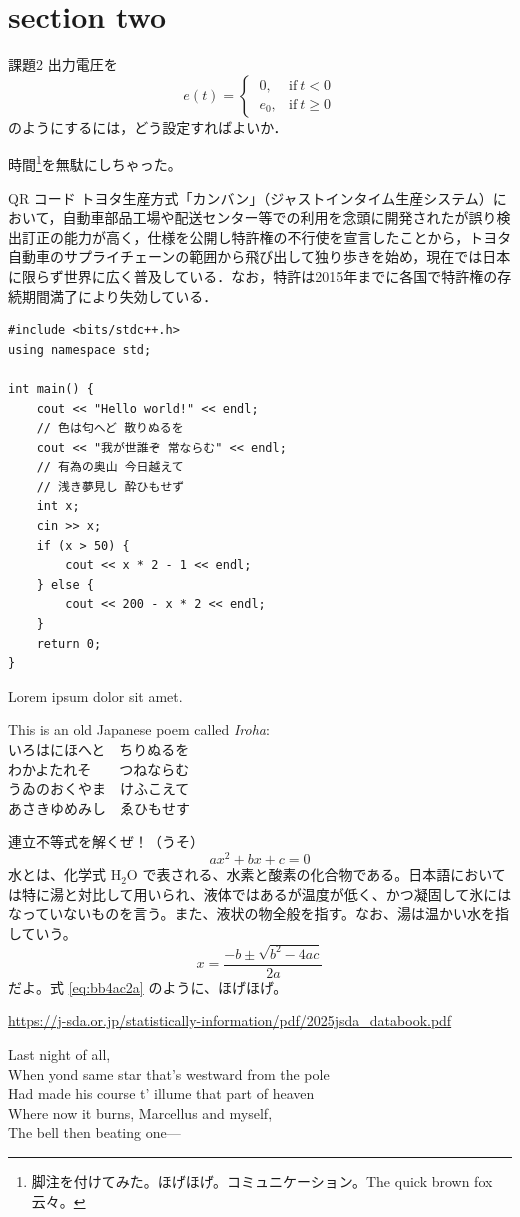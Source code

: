 \section{section two}

\begin{mytbox}{課題2}
	出力電圧を
	\begin{equation*}
		e(t) =
		\begin{cases}
			\ 0,   & \text{if}\ t < 0   \\
			\ e_0, & \text{if}\ t \ge 0
		\end{cases}
	\end{equation*}
	のようにするには，どう設定すればよいか．
\end{mytbox}

時間\footnote{脚注を付けてみた。ほげほげ。コミュニケーション。The quick brown fox 云々。}を無駄にしちゃった。

\begin{mybbox}{QR コード}
	トヨタ生産方式「カンバン」（ジャストインタイム生産システム）において，自動車部品工場や配送センター等での利用を念頭に開発されたが誤り検出訂正の能力が高く，仕様を公開し特許権の不行使を宣言したことから，トヨタ自動車のサプライチェーンの範囲から飛び出して独り歩きを始め，現在では日本に限らず世界に広く普及している．なお，特許は2015年までに各国で特許権の存続期間満了により失効している．
\end{mybbox}

\begin{verbatim}
#include <bits/stdc++.h>
using namespace std;

int main() {
    cout << "Hello world!" << endl;
    // 色は匂へど 散りぬるを
    cout << "我が世誰ぞ 常ならむ" << endl;
    // 有為の奥山 今日越えて
    // 浅き夢見し 酔ひもせず
    int x;
    cin >> x;
    if (x > 50) {
        cout << x * 2 - 1 << endl;
    } else {
        cout << 200 - x * 2 << endl;
    }
    return 0;
}
\end{verbatim}

Lorem ipsum dolor sit amet.

This is an old Japanese poem called \emph{Iroha}: \\
いろはにほへと　ちりぬるを \\
わかよたれそ　　つねならむ \\
うゐのおくやま　けふこえて \\
あさきゆめみし　ゑひもせす

連立不等式を解くぜ！（うそ）
\begin{equation}
	ax^2 + bx + c = 0
\end{equation}
水とは、化学式 \(\textrm{H}_2\textrm{O}\) で表される、水素と酸素の化合物である。日本語においては特に湯と対比して用いられ、液体ではあるが温度が低く、かつ凝固して氷にはなっていないものを言う。また、液状の物全般を指す。なお、湯は温かい水を指していう。
\begin{equation}
	x = \frac{-b \pm \sqrt{b^2 - 4ac}}{2a}
    \label{eq:bb4ac2a}
\end{equation}
だよ。式 \ref{eq:bb4ac2a} のように、ほげほげ。

\url{https://j-sda.or.jp/statistically-information/pdf/2025jsda_databook.pdf}

Last night of all, \\
When yond same star that's westward from the pole \\
Had made his course t' illume that part of heaven \\
Where now it burns, Marcellus and myself, \\
The bell then beating one—
